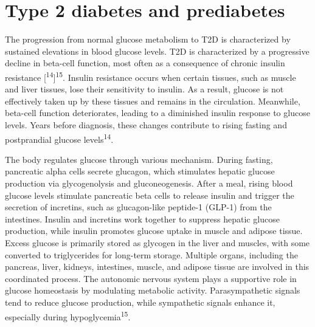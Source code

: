 \documentclass[
  a4paper,
  headsepline=true,
  open=any]{scrbook}
\begin{document}
\hypertarget{type-2-diabetes-and-prediabetes}{%
\section{Type 2 diabetes and
prediabetes}\label{type-2-diabetes-and-prediabetes}}

The progression from normal glucose metabolism to T2D is characterized
by sustained elevations in blood glucose levels. T2D is characterized by
a progressive decline in beta-cell function, most often as a consequence
of chronic insulin resistance
{[}\textsuperscript{14}{]}\textsuperscript{15}. Insulin resistance
occurs when certain tissues, such as muscle and liver tissues, lose
their sensitivity to insulin. As a result, glucose is not effectively
taken up by these tissues and remains in the circulation. Meanwhile,
beta-cell function deteriorates, leading to a diminished insulin
response to glucose levels. Years before diagnosis, these changes
contribute to rising fasting and postprandial glucose
levels\textsuperscript{14}.

The body regulates glucose through various mechanism. During fasting,
pancreatic alpha cells secrete glucagon, which stimulates hepatic
glucose production via glycogenolysis and gluconeogenesis. After a meal,
rising blood glucose levels stimulate pancreatic beta cells to release
insulin and trigger the secretion of incretins, such as glucagon-like
peptide-1 (GLP-1) from the intestines. Insulin and incretins work
together to suppress hepatic glucose production, while insulin promotes
glucose uptake in muscle and adipose tissue. Excess glucose is primarily
stored as glycogen in the liver and muscles, with some converted to
triglycerides for long-term storage. Multiple organs, including the
pancreas, liver, kidneys, intestines, muscle, and adipose tissue are
involved in this coordinated process. The autonomic nervous system plays
a supportive role in glucose homeostasis by modulating metabolic
activity. Parasympathetic signals tend to reduce glucose production,
while sympathetic signals enhance it, especially during
hypoglycemia\textsuperscript{15}.
\end{document}
